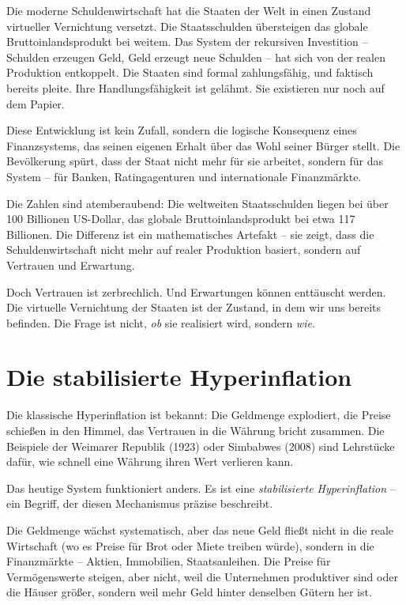 \documentclass[12pt,a4paper]{book}
\begin{document}
Die moderne Schuldenwirtschaft hat die Staaten der Welt in einen Zustand virtueller Vernichtung versetzt. Die Staatsschulden übersteigen das globale Bruttoinlandsprodukt bei weitem. Das System der rekursiven Investition – Schulden erzeugen Geld, Geld erzeugt neue Schulden – hat sich von der realen Produktion entkoppelt. Die Staaten sind formal zahlungsfähig, und faktisch bereits pleite. Ihre Handlungsfähigkeit ist gelähmt. Sie existieren nur noch auf dem Papier.

Diese Entwicklung ist kein Zufall, sondern die logische Konsequenz eines Finanzsystems, das seinen eigenen Erhalt über das Wohl seiner Bürger stellt. Die Bevölkerung spürt, dass der Staat nicht mehr für sie arbeitet, sondern für das System – für Banken, Ratingagenturen und internationale Finanzmärkte.

Die Zahlen sind atemberaubend: Die weltweiten Staatsschulden liegen bei über 100 Billionen US-Dollar, das globale Bruttoinlandsprodukt bei etwa 117 Billionen. Die Differenz ist ein mathematisches Artefakt – sie zeigt, dass die Schuldenwirtschaft nicht mehr auf realer Produktion basiert, sondern auf Vertrauen und Erwartung.

Doch Vertrauen ist zerbrechlich. Und Erwartungen können enttäuscht werden. Die virtuelle Vernichtung der Staaten ist der Zustand, in dem wir uns bereits befinden. Die Frage ist nicht, \emph{ob} sie realisiert wird, sondern \emph{wie}.

\chapter{Die stabilisierte Hyperinflation}

Die klassische Hyperinflation ist bekannt: Die Geldmenge explodiert, die Preise schießen in den Himmel, das Vertrauen in die Währung bricht zusammen. Die Beispiele der Weimarer Republik (1923) oder Simbabwes (2008) sind Lehrstücke dafür, wie schnell eine Währung ihren Wert verlieren kann.

Das heutige System funktioniert anders. Es ist eine \emph{stabilisierte Hyperinflation} – ein Begriff, der diesen Mechanismus präzise beschreibt.

Die Geldmenge wächst systematisch, aber das neue Geld fließt nicht in die reale Wirtschaft (wo es Preise für Brot oder Miete treiben würde), sondern in die Finanzmärkte – Aktien, Immobilien, Staatsanleihen. Die Preise für Vermögenswerte steigen, aber nicht, weil die Unternehmen produktiver sind oder die Häuser größer, sondern weil mehr Geld hinter denselben Gütern her ist.
\end{document}
